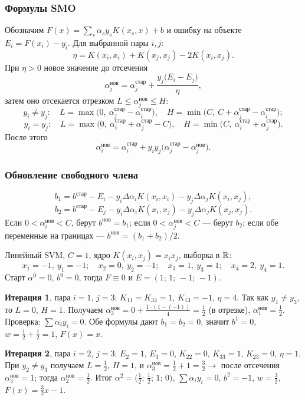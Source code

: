 \subsubsection*{Формулы SMO}

Обозначим $F(x) = \sum_s \alpha_s y_s K(x_s,x) + b$ и ошибку на объекте
$E_i = F(x_i) - y_i$. Для выбранной пары $i, j$:
\[
  \eta = K(x_i,x_i) + K(x_j,x_j) - 2K(x_i,x_j) .
\]
При $\eta > 0$ новое значение до отсечения
\[
  \alpha_j^{\text{нов}} = \alpha_j^{\text{стар}}
    + \frac{y_j\big(E_i - E_j\big)}{\eta} ,
\]
затем оно отсекается отрезком $L \le \alpha_j^{\text{нов}} \le H$:
\[
  y_i \ne y_j : \quad
  L = \max\big(0,\ \alpha_j^{\text{стар}} - \alpha_i^{\text{стар}}\big) ,
  \quad
  H = \min\big(C,\ C + \alpha_j^{\text{стар}} - \alpha_i^{\text{стар}}\big) ;
\]
\[
  y_i = y_j : \quad
  L = \max\big(0,\ \alpha_i^{\text{стар}} + \alpha_j^{\text{стар}} - C\big) ,
  \quad
  H = \min\big(C,\ \alpha_i^{\text{стар}} + \alpha_j^{\text{стар}}\big) .
\]
После этого
\[
  \alpha_i^{\text{нов}} = \alpha_i^{\text{стар}}
    + y_i y_j\big(\alpha_j^{\text{стар}} - \alpha_j^{\text{нов}}\big) .
\]

\subsubsection*{Обновление свободного члена}

\[
  b_1 = b^{\text{стар}} - E_i
    - y_i\Delta\alpha_i K(x_i,x_i) - y_j\Delta\alpha_j K(x_i,x_j) ,
\]
\[
  b_2 = b^{\text{стар}} - E_j
    - y_i\Delta\alpha_i K(x_i,x_j) - y_j\Delta\alpha_j K(x_j,x_j) .
\]
Если $0 < \alpha_i^{\text{нов}} < C$, берут $b^{\text{нов}} = b_1$; если
$0 < \alpha_j^{\text{нов}} < C$ — берут $b_2$; если обе переменные на границах
— $b^{\text{нов}} = (b_1 + b_2)/2$.

\begin{example}
Линейный SVM, $C = 1$, ядро $K(x_i,x_j) = x_i x_j$, выборка в $\mathbb{R}$:
\[
  x_1 = -1,\ y_1 = -1 ; \quad x_2 = 0,\ y_2 = -1 ; \quad
  x_3 = 1,\ y_3 = 1 ; \quad x_4 = 2,\ y_4 = 1 .
\]
Старт $\alpha^0 = 0$, $b^0 = 0$, тогда $F \equiv 0$ и
$E = (1;\,1;\,-1;\,-1)$.

\textbf{Итерация 1}, пара $i=1$, $j=3$: $K_{11} = K_{33} = 1$,
$K_{13} = -1$, $\eta = 4$. Так как $y_1 \ne y_3$, то $L = 0$, $H = 1$.
Получаем $\alpha_3^{\text{нов}} = 0 + \tfrac{1\cdot(1-(-1))}{4} = \tfrac12$
(в отрезке), $\alpha_1^{\text{нов}} = \tfrac12$. Проверка:
$\sum\alpha_i y_i = 0$. Обе формулы дают $b_1 = b_2 = 0$, значит $b^1 = 0$,
$w = \tfrac12 + \tfrac12 = 1$, $F(x) = x$.

\textbf{Итерация 2}, пара $i=2$, $j=3$: $E_2 = 1$, $E_3 = 0$,
$K_{22} = 0$, $K_{33} = 1$, $K_{23} = 0$, $\eta = 1$. При $y_2 \ne y_3$
получаем $L = \tfrac12$, $H = 1$, и
$\alpha_3^{\text{нов}} = \tfrac12 + 1 = \tfrac32 \to$ после отсечения
$\alpha_3^{\text{нов}} = 1$; тогда $\alpha_2^{\text{нов}} = \tfrac12$.
Итог $\alpha^2 = \big(\tfrac12;\,\tfrac12;\,1;\,0\big)$,
$\sum\alpha_iy_i = 0$, $b^2 = -1$, $w = \tfrac32$,
$F(x) = \tfrac32 x - 1$.
\end{example}

